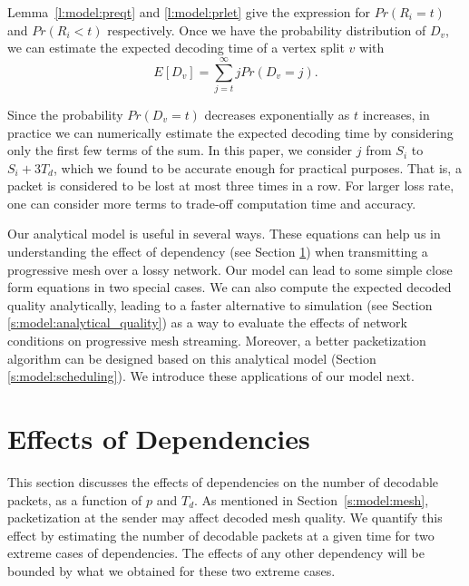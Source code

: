     Lemma~\ref{l:model:preqt} and \ref{l:model:prlet} give the expression
    for $Pr(R_i=t)$ and $Pr(R_i<t)$ respectively.
    Once we have the probability distribution of $D_v$, we can
    estimate the expected decoding time of a vertex split $v$
    with
    \begin{equation}
    \label{e:model:e_et}
        E[D_v] = \sum_{j=t}^{\infty}jPr(D_v = j).
    \end{equation}

    Since the probability $Pr(D_v = t)$ decreases exponentially
    as $t$ increases, in practice we can numerically estimate the
    expected decoding time by considering only the first few
    terms of the sum.  In this paper, we consider $j$ from $S_i$ to $S_i + 3T_d$,
    which we found to be accurate enough for practical purposes.
    That is,
    a packet is considered to be lost at most three times in a row.
    For larger loss rate, one can consider more terms to trade-off
    computation time and accuracy.


    Our analytical model is useful in several ways.  
    These equations can help us in understanding the effect of dependency (see Section \ref{s:model:effect}) when transmitting 
    a progressive mesh over a lossy network.  Our model can lead to some simple close form equations in two special cases.  
    We can also compute the expected decoded quality analytically, leading to a faster alternative to 
    simulation (see Section \ref{s:model:analytical_quality}) as a way to evaluate the effects of network conditions on
    progressive mesh streaming.
    Moreover, a better packetization algorithm can be designed based on this analytical model (Section \ref{s:model:scheduling}). 
    We introduce these applications of our model next.


\section{Effects of Dependencies}
\label{s:model:effect}

    This section discusses the effects of dependencies
    on the number of decodable packets, as a function of
    $p$ and $T_d$.  As mentioned in Section~\ref{s:model:mesh},
    packetization at the sender may affect
    decoded mesh quality.  We quantify 
    this effect by estimating the number of
    decodable packets at a given time for two extreme cases
    of dependencies.  The effects of any other dependency
    will be bounded by what we obtained for these two extreme cases.

